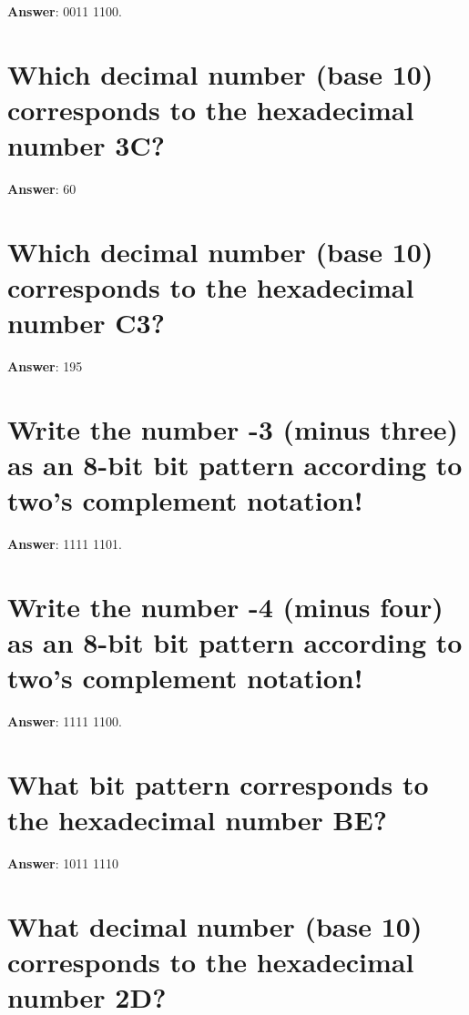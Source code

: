 \documentclass[a4paper,11pt,oneside]{book}
\begin{document}
\begin{sloppypar}
\label{q:389:sa:en:True}

\textbf{Answer}: 0011 1100.



\section{Which decimal number (base 10) corresponds to the hexadecimal number 3C?}

\label{q:390:sa:en:True}

\textbf{Answer}: 60



\section{Which decimal number (base 10) corresponds to the hexadecimal number C3?}

\label{q:391:sa:en:True}

\textbf{Answer}: 195



\section{Write the number -3 (minus three) as an 8-bit bit pattern according to two's complement notation!}

\label{q:392:sa:en:True}

\textbf{Answer}: 1111 1101.



\section{Write the number -4 (minus four) as an 8-bit bit pattern according to two's complement notation!}

\label{q:393:sa:en:True}

\textbf{Answer}: 1111 1100.



\section{What bit pattern corresponds to the hexadecimal number BE?}

\label{q:394:sa:en:True}

\textbf{Answer}: 1011 1110



\section{What decimal number (base 10) corresponds to the hexadecimal number 2D?}


\end{sloppypar}
\end{document}
